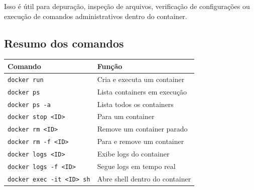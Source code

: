 Isso é útil para depuração, inspeção de arquivos, verificação de configurações ou execução de comandos administrativos dentro do container.

\subsection{Resumo dos comandos}

\begin{center}
\begin{tabular}{|l|l|}
\hline
\textbf{Comando} & \textbf{Função} \\
\hline
\texttt{docker run} & Cria e executa um container \\
\texttt{docker ps} & Lista containers em execução \\
\texttt{docker ps -a} & Lista todos os containers \\
\texttt{docker stop <ID>} & Para um container \\
\texttt{docker rm <ID>} & Remove um container parado \\
\texttt{docker rm -f <ID>} & Para e remove um container \\
\texttt{docker logs <ID>} & Exibe logs do container \\
\texttt{docker logs -f <ID>} & Segue logs em tempo real \\
\texttt{docker exec -it <ID> sh} & Abre shell dentro do container \\
\hline
\end{tabular}
\end{center}

